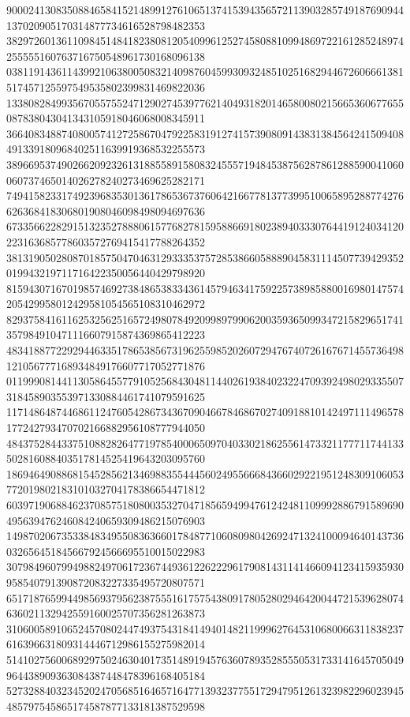 \begin{DoxyCode}
      900024130835088465841521489912761065137415394356572113903285749187690944137020905170314877734616528798482353
      382972601361109845148418238081205409961252745808810994869722161285248974255555160763716750548961730168096138
      038119143611439921063800508321409876045993093248510251682944672606661381517457125597549535802399831469822036
      133808284993567055755247129027453977621404931820146580080215665360677655087838043041343105918046068008345911
      366408348874080057412725867047922583191274157390809143831384564241509408491339180968402511639919368532255573
      389669537490266209232613188558915808324555719484538756287861288590041060060737465014026278240273469625282171
      749415823317492396835301361786536737606421667781377399510065895288774276626368418306801908046098498094697636
      673356622829151323527888061577682781595886691802389403330764419124034120223163685778603572769415417788264352
      381319050280870185750470463129333537572853866058889045831114507739429352019943219711716422350056440429798920
      815943071670198574692738486538334361457946341759225738985880016980147574205429958012429581054565108310462972
      829375841611625325625165724980784920998979906200359365099347215829651741357984910471116607915874369865412223
      483418877229294463351786538567319625598520260729476740726167671455736498121056777168934849176607717052771876
      011999081441130586455779105256843048114402619384023224709392498029335507318458903553971330884461741079591625
      117148648744686112476054286734367090466784686702740918810142497111496578177242793470702166882956108777944050
      484375284433751088282647719785400065097040330218625561473321177711744133502816088403517814525419643203095760
      186946490886815452856213469883554445602495566684366029221951248309106053772019802183101032704178386654471812
      603971906884623708575180800353270471856594994761242481109992886791589690495639476246084240659309486215076903
      149870206735338483495508363660178487710608098042692471324100094640143736032656451845667924566695510015022983
      307984960799498824970617236744936122622296179081431141466094123415935930958540791390872083227335495720807571
      651718765994498569379562387555161757543809178052802946420044721539628074636021132942559160025707356281263873
      310600589106524570802447493754318414940148211999627645310680066311838237616396631809314446712986155275982014
      514102756006892975024630401735148919457636078935285550531733141645705049964438909363084387448478396168405184
      527328840323452024705685164657164771393237755172947951261323982296023945485797545865174587877133181387529598

\end{DoxyCode}
